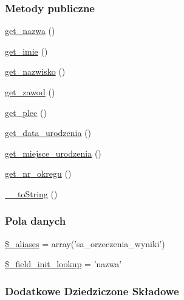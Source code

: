 \subsubsection*{Metody publiczne}
\begin{DoxyCompactItemize}
\item 
\hyperlink{classep___s_a___orzeczenie___wynik_ac0818f0049d7b84f08f77128f54cee36}{get\-\_\-nazwa} ()
\item 
\hyperlink{classep___s_a___orzeczenie___wynik_ac4b0c85dc2a130038f2d118dbd0c3d77}{get\-\_\-imie} ()
\item 
\hyperlink{classep___s_a___orzeczenie___wynik_abdd1d7ff92508da7f748ba1feec97af0}{get\-\_\-nazwisko} ()
\item 
\hyperlink{classep___s_a___orzeczenie___wynik_af80ca8310b60004454dd02a387deaa2c}{get\-\_\-zawod} ()
\item 
\hyperlink{classep___s_a___orzeczenie___wynik_ac7f9af5c3fa024e4c26a7b6bd4ce4bb4}{get\-\_\-plec} ()
\item 
\hyperlink{classep___s_a___orzeczenie___wynik_a880b240cd2d8c336fd1709bf0cb1ae2c}{get\-\_\-data\-\_\-urodzenia} ()
\item 
\hyperlink{classep___s_a___orzeczenie___wynik_ac57c08ec5e394a19c5bd9280c8376182}{get\-\_\-miejsce\-\_\-urodzenia} ()
\item 
\hyperlink{classep___s_a___orzeczenie___wynik_a2645a9f0aa5b0ccc482943348c033d0a}{get\-\_\-nr\-\_\-okregu} ()
\item 
\hyperlink{classep___s_a___orzeczenie___wynik_a7516ca30af0db3cdbf9a7739b48ce91d}{\-\_\-\-\_\-to\-String} ()
\end{DoxyCompactItemize}
\subsubsection*{Pola danych}
\begin{DoxyCompactItemize}
\item 
\hyperlink{classep___s_a___orzeczenie___wynik_ab4e31d75f0bc5d512456911e5d01366b}{\$\-\_\-aliases} = array('sa\-\_\-orzeczenia\-\_\-wyniki')
\item 
\hyperlink{classep___s_a___orzeczenie___wynik_a4a4d54ae35428077a7c61ec8a5139af3}{\$\-\_\-field\-\_\-init\-\_\-lookup} = 'nazwa'
\end{DoxyCompactItemize}
\subsubsection*{Dodatkowe Dziedziczone Składowe}


